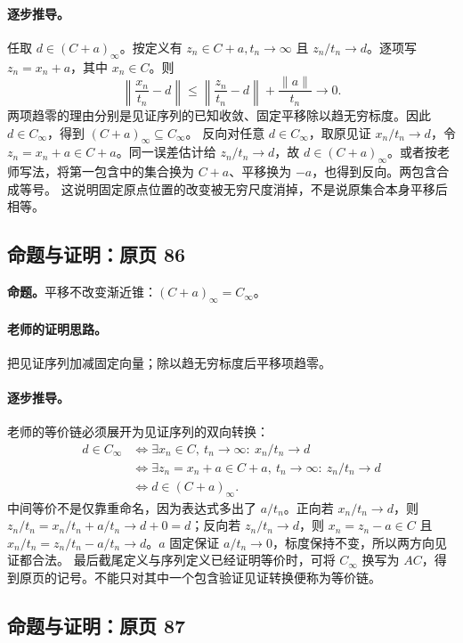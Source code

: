 \paragraph{逐步推导。}
任取 $d\in(C+a)_\infty$。按定义有 $z_n\in C+a,t_n\to\infty$ 且 $z_n/t_n\to d$。逐项写 $z_n=x_n+a$，其中 $x_n\in C$。则
\[\left\|\frac{x_n}{t_n}-d\right\|\le\left\|\frac{z_n}{t_n}-d\right\|+\frac{\|a\|}{t_n}\to0.\]
两项趋零的理由分别是见证序列的已知收敛、固定平移除以趋无穷标度。因此 $d\in C_\infty$，得到 $(C+a)_\infty\subseteq C_\infty$。
反向对任意 $d\in C_\infty$，取原见证 $x_n/t_n\to d$，令 $z_n=x_n+a\in C+a$。同一误差估计给 $z_n/t_n\to d$，故 $d\in(C+a)_\infty$。或者按老师写法，将第一包含中的集合换为 $C+a$、平移换为 $-a$，也得到反向。两包含合成等号。
这说明固定原点位置的改变被无穷尺度消掉，不是说原集合本身平移后相等。


\subsection{命题与证明：原页 86}

\textbf{命题。}平移不改变渐近锥：$(C+a)_\infty=C_\infty$。

\paragraph{老师的证明思路。}把见证序列加减固定向量；除以趋无穷标度后平移项趋零。

\paragraph{逐步推导。}
老师的等价链必须展开为见证序列的双向转换：
\begin{align*}
d\in C_\infty
&\iff\exists x_n\in C,\ t_n\to\infty:\ x_n/t_n\to d\\
&\iff\exists z_n=x_n+a\in C+a,\ t_n\to\infty:\ z_n/t_n\to d\\
&\iff d\in(C+a)_\infty.
\end{align*}
中间等价不是仅靠重命名，因为表达式多出了 $a/t_n$。正向若 $x_n/t_n\to d$，则 $z_n/t_n=x_n/t_n+a/t_n\to d+0=d$；反向若 $z_n/t_n\to d$，则 $x_n=z_n-a\in C$ 且 $x_n/t_n=z_n/t_n-a/t_n\to d$。$a$ 固定保证 $a/t_n\to0$，标度保持不变，所以两方向见证都合法。
最后截尾定义与序列定义已经证明等价时，可将 $C_\infty$ 换写为 $AC$，得到原页的记号。不能只对其中一个包含验证见证转换便称为等价链。


\subsection{命题与证明：原页 87}

